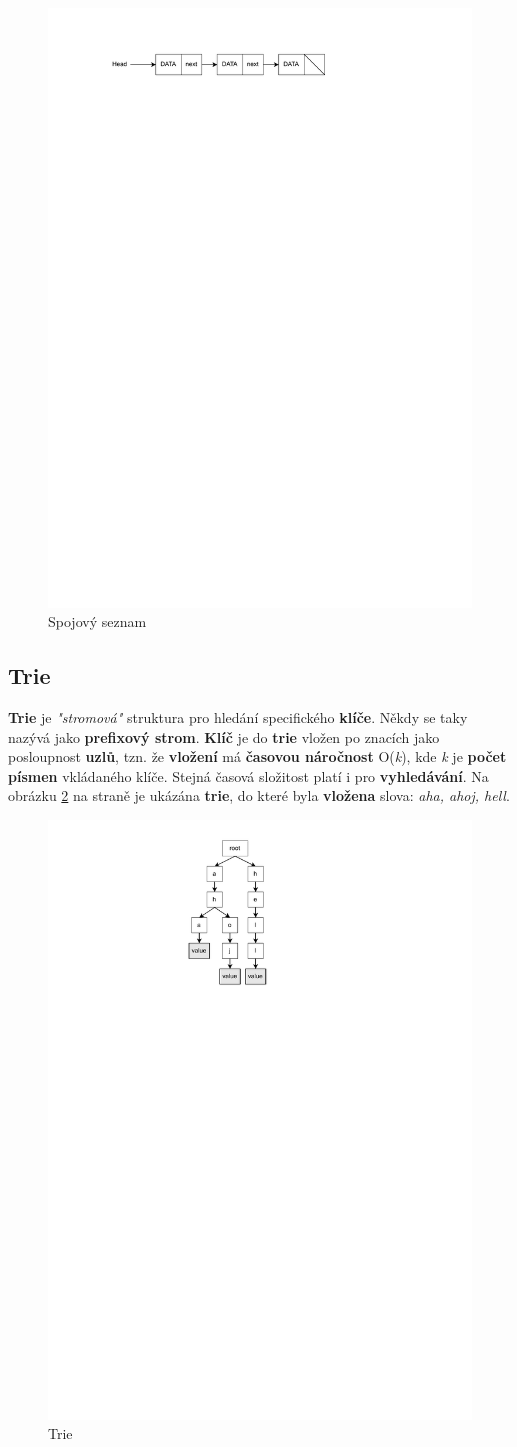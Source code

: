 \documentclass[12pt]{report}
\begin{document}
			\begin{figure}[h]
				\centering
				\includegraphics[width=.7\textwidth]{img/linkedlist}
				\caption{Spojový seznam}
				\label{fig:spojsez}
			\end{figure}
		
		\clearpage
		
		\subsection{Trie}
		
		\textbf{Trie} je \textit{"stromová"} struktura pro hledání specifického \textbf{klíče}. Někdy se taky nazývá jako \textbf{prefixový strom}. \textbf{Klíč} je do \textbf{trie} vložen po znacích jako posloupnost \textbf{uzlů}, tzn. že \textbf{vložení} má \textbf{časovou náročnost} O(\textit{k}), kde \textit{k} je \textbf{počet písmen} vkládaného klíče. Stejná časová složitost platí i pro \textbf{vyhledávání}. Na obrázku \ref{fig:trie} na straně \pageref{fig:trie} je ukázána \textbf{trie}, do které byla \textbf{vložena} slova: \textit{aha, ahoj, hell}.
		
		\begin{figure}[h]
			\centering
			\includegraphics[width=.18\textwidth]{img/trie}
			\caption{Trie}
			\label{fig:trie}
		\end{figure}
		
\end{document}
